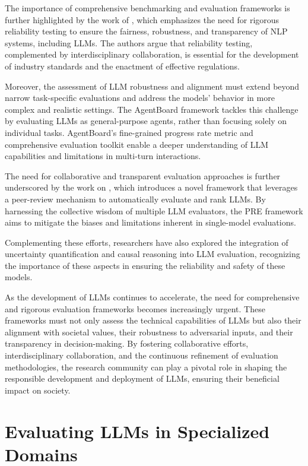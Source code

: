 \documentclass[11pt]{article}
\begin{document}
The importance of comprehensive benchmarking and evaluation frameworks is further highlighted by the work of \cite{ref157}, which emphasizes the need for rigorous reliability testing to ensure the fairness, robustness, and transparency of NLP systems, including LLMs. The authors argue that reliability testing, complemented by interdisciplinary collaboration, is essential for the development of industry standards and the enactment of effective regulations.

Moreover, the assessment of LLM robustness and alignment must extend beyond narrow task-specific evaluations and address the models' behavior in more complex and realistic settings. The AgentBoard framework \cite{ref208} tackles this challenge by evaluating LLMs as general-purpose agents, rather than focusing solely on individual tasks. AgentBoard's fine-grained progress rate metric and comprehensive evaluation toolkit enable a deeper understanding of LLM capabilities and limitations in multi-turn interactions.

The need for collaborative and transparent evaluation approaches is further underscored by the work on \cite{ref80}, which introduces a novel framework that leverages a peer-review mechanism to automatically evaluate and rank LLMs. By harnessing the collective wisdom of multiple LLM evaluators, the PRE framework aims to mitigate the biases and limitations inherent in single-model evaluations.

Complementing these efforts, researchers have also explored the integration of uncertainty quantification \cite{ref209} and causal reasoning \cite{ref210} into LLM evaluation, recognizing the importance of these aspects in ensuring the reliability and safety of these models.

As the development of LLMs continues to accelerate, the need for comprehensive and rigorous evaluation frameworks becomes increasingly urgent. These frameworks must not only assess the technical capabilities of LLMs but also their alignment with societal values, their robustness to adversarial inputs, and their transparency in decision-making. By fostering collaborative efforts, interdisciplinary collaboration, and the continuous refinement of evaluation methodologies, the research community can play a pivotal role in shaping the responsible development and deployment of LLMs, ensuring their beneficial impact on society.

\section{Evaluating LLMs in Specialized Domains}
\end{document}
